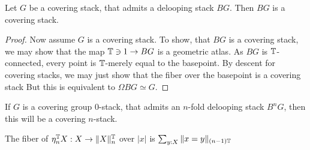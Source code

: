 \begin{lemma}{\label{lemma:deloopingCS}}
	Let $G$ be a covering stack, that admits a delooping stack $B G$. Then $B G$ is a covering stack.
\end{lemma}
\begin{proof}
	Now assume $G$ is a covering stack. 	To show, that  $B G$ is a covering stack, we may show that the map $\mathbb{T} \ni 1 \to B G$ is a geometric atlas. As $B G$ is $\mathbb{T}$-connected, every point is $\mathbb{T}$-merely equal to the basepoint. By descent for covering stacks, we may just show that the fiber over the basepoint is a covering stack
	But this is equivalent to $\Omega B G \simeq G$. 
\end{proof}
\begin{corollary}
	If $G$ is a covering group 0-stack,  that admits an $n$-fold delooping stack $B^n G$, then this will be a covering $n$-stack.
\end{corollary}
\begin{lemma}
	The fiber of $\eta_n^{\mathbb{T}} X : X \to \|X\|_n^{\mathbb{T}}$ over $|x|$ is $\sum_{y : X} \| x = y\|_{(n-1)\mathbb{T}}$
\end{lemma}
